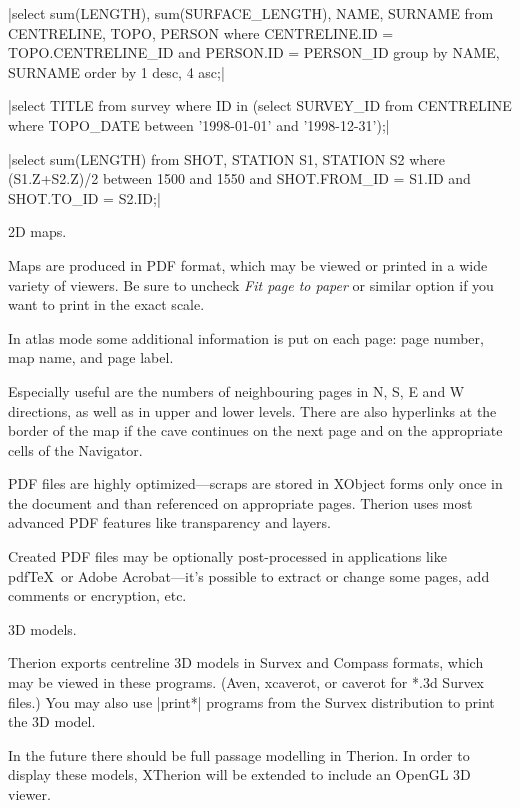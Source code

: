 |select sum(LENGTH), sum(SURFACE_LENGTH), NAME, SURNAME 
  from CENTRELINE, TOPO, PERSON 
  where CENTRELINE.ID = TOPO.CENTRELINE_ID and PERSON.ID = PERSON_ID 
  group by NAME, SURNAME order by 1 desc, 4 asc;|


|select TITLE from survey where ID in 
  (select SURVEY_ID from CENTRELINE 
  where TOPO_DATE between '1998-01-01' and '1998-12-31');|


|select sum(LENGTH) from SHOT, STATION S1, STATION S2 
  where (S1.Z+S2.Z)/2 between 1500 and 1550 and 
  SHOT.FROM_ID = S1.ID and SHOT.TO_ID = S2.ID;|


\subchapter 2D maps.

Maps are produced in PDF format, which may be viewed or printed in a wide 
variety of viewers. Be sure to uncheck {\it Fit page to paper} or similar 
option if you want to print in the exact scale.

In atlas mode some additional information is put on each page: page 
number, map name, and page label.

Especially useful are the numbers of neighbouring pages in N, S, E and W 
directions, as well as in upper and lower levels. There are also hyperlinks at 
the border of the map if the cave continues on the next page and on the 
appropriate cells of the Navigator.

PDF files are highly optimized---scraps are stored in XObject forms only once 
in the document and than referenced on appropriate pages. 
Therion uses most advanced PDF features like transparency and layers.

Created PDF files may be optionally post-processed in applications like 
pdf\TeX\ or Adobe Acrobat---it's possible to extract or change some pages, add 
comments or encryption, etc.


\subchapter 3D models.

Therion exports centreline 3D models in Survex and Compass formats, which may 
be viewed in these programs. (Aven, xcaverot, or caverot for *.3d Survex files.)
You may also use |print*| programs from the Survex distribution to print the 
3D model.

In the future there should be full passage modelling in Therion. In order to 
display these models, XTherion will be extended to include an OpenGL 3D viewer.

\endinput
